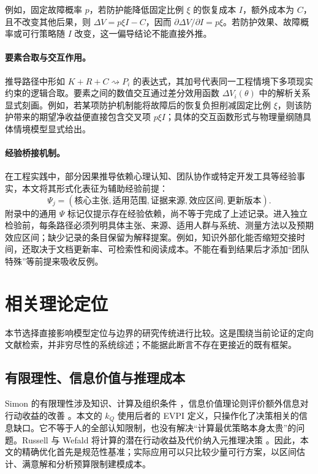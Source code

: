 \documentclass[11pt,a4paper]{ctexart}
\numberwithin{equation}{section}
\theoremstyle{definition}
\theoremstyle{plain}
\begin{document}
例如，固定故障概率 $p$，若防护能降低固定比例 $\xi$ 的恢复成本 $I$，额外成本为 $C$，且不改变其他后果，则 $\Delta V=p\xi I-C$，因而 $\partial\Delta V/\partial I=p\xi$。若防护效果、故障概率或可行策略随 $I$ 改变，这一偏导结论不能直接外推。

\paragraph{要素合取与交互作用。}
推导路径中形如 $K+R+C\rightsquigarrow P_i$ 的表达式，其加号代表同一工程情境下多项现实约束的逻辑合取。要素之间的数值交互通过差分效用函数 $\Delta V_i(\theta)$ 中的解析关系显式刻画。例如，若某项防护机制能将故障后的恢复负担削减固定比例 $\xi$，则该防护带来的期望净收益便直接包含交叉项 $p\xi I$；具体的交互函数形式与物理量纲随具体情境模型显式给出。

\paragraph{经验桥接机制。}
在工程实践中，部分因果推导依赖心理认知、团队协作或特定开发工具等经验事实，本文将其形式化表征为辅助经验前提：
\[
\Psi_j=(\text{核心主张},\text{适用范围},\text{证据来源},\text{效应区间},\text{更新版本}).
\]
附录中的通用 $\Psi$ 标记仅提示存在经验依赖，尚不等于完成了上述记录。进入独立检验前，每条路径必须列明具体主张、来源、适用人群与系统、测量方法以及预期效应区间；缺少记录的条目保留为解释提案。例如，知识外部化能否缩短交接时间，还取决于文档更新率、可检索性和阅读成本。不能在看到结果后才添加“团队特殊”等前提来吸收反例。

\section{相关理论定位}

本节选择直接影响模型定位与边界的研究传统进行比较。这是围绕当前论证的定向文献检索，并非穷尽性的系统综述；不能据此断言不存在更接近的既有框架。

\subsection{有限理性、信息价值与推理成本}

Simon 的有限理性涉及知识、计算及组织条件 \cite{simon1978}，信息价值理论则评价额外信息对行动收益的改善 \cite{howard1966}。本文的 $k_Q$ 使用后者的 EVPI 定义，只操作化了决策相关的信息缺口。它不等于人的全部认知限制，也没有解决“计算最优策略本身太贵”的问题。Russell 与 Wefald 将计算的潜在行动收益及代价纳入元推理决策 \cite{russell1991}。因此，本文的精确优化首先是规范性基准；实际应用可以只比较少量可行方案，以区间估计、满意解和分析预算限制建模成本。
\end{document}
